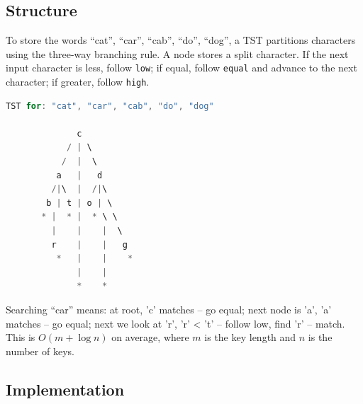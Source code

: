 \subsection{Structure}

To store the words ``cat'', ``car'', ``cab'', ``do'', ``dog'', a TST partitions characters using the three-way branching rule. A node stores a split character. If the next input character is less, follow \texttt{low}; if equal, follow \texttt{equal} and advance to the next character; if greater, follow \texttt{high}.

\begin{lstlisting}[language=Java]
TST for: "cat", "car", "cab", "do", "dog"

              c
            / | \
           /  |  \
          a   |   d
         /|\  |  /|\
        b | t | o | \
       * |  * |  * \ \
         |    |    |  \
         r    |    |   g
          *   |    |    *
              |    |
              *    *
\end{lstlisting}

Searching ``car'' means: at root, 'c' matches -- go equal; next node is 'a', 'a' matches -- go equal; next we look at 'r', 'r' < 't' -- follow low, find 'r' -- match. This is $O(m + \log n)$ on average, where $m$ is the key length and $n$ is the number of keys.

\subsection{Implementation}

